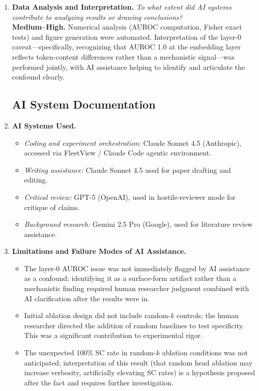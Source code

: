 \begin{enumerate}
\item \textbf{Data Analysis and Interpretation.}
\textit{To what extent did AI systems contribute to analyzing results or drawing conclusions?} \\
\textbf{Medium--High.} Numerical analysis (AUROC computation, Fisher exact tests) and figure generation were automated. Interpretation of the layer-0 caveat---specifically, recognizing that AUROC 1.0 at the embedding layer reflects token-content differences rather than a mechanistic signal---was performed jointly, with AI assistance helping to identify and articulate the confound clearly.

\subsection*{AI System Documentation}

\item \textbf{AI Systems Used.}
\begin{itemize}
  \item \textit{Coding and experiment orchestration:} Claude Sonnet 4.5 (Anthropic), accessed via FleetView / Claude Code agentic environment.
  \item \textit{Writing assistance:} Claude Sonnet 4.5 used for paper drafting and editing.
  \item \textit{Critical review:} GPT-5 (OpenAI), used in hostile-reviewer mode for critique of claims.
  \item \textit{Background research:} Gemini 2.5 Pro (Google), used for literature review assistance.
\end{itemize}

\item \textbf{Limitations and Failure Modes of AI Assistance.}
\begin{itemize}
  \item The layer-0 AUROC issue was not immediately flagged by AI assistance as a confound; identifying it as a surface-form artifact rather than a mechanistic finding required human researcher judgment combined with AI clarification after the results were in.
  \item Initial ablation design did not include random-$k$ controls; the human researcher directed the addition of random baselines to test specificity. This was a significant contribution to experimental rigor.
  \item The unexpected 100\% SC rate in random-$k$ ablation conditions was not anticipated; interpretation of this result (that random head ablation may increase verbosity, artificially elevating SC rates) is a hypothesis proposed after the fact and requires further investigation.
\end{itemize}

\end{enumerate}
